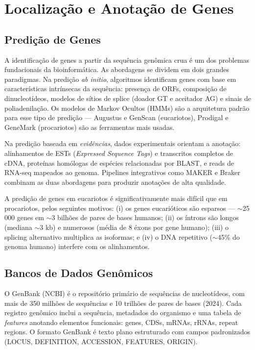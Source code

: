 \section{Localização e Anotação de Genes}

\subsection{Predição de Genes}

A identificação de genes a partir da sequência genômica crua é um dos problemas fundacionais
da bioinformática. As abordagens se dividem em dois grandes paradigmas. Na predição
\emph{ab initio}, algoritmos identificam genes com base em características intrínsecas da
sequência: presença de ORFs, composição de dinucleotídeos, modelos de sítios de splice
(doador GT e aceitador AG) e sinais de poliadenilação. Os modelos de Markov Ocultos (HMMs)
são a arquitetura padrão para esse tipo de predição --- Augustus e GenScan (eucariotos),
Prodigal e GeneMark (procariotos) são as ferramentas mais usadas.

Na predição baseada em \emph{evidências}, dados experimentais orientam a anotação:
alinhamentos de ESTs (\textit{Expressed Sequence Tags}) e transcritos completos de cDNA,
proteínas homólogas de espécies relacionadas por BLAST, e reads de RNA-seq mapeados ao
genoma. Pipelines integrativos como MAKER e Braker combinam as duas abordagens para
produzir anotações de alta qualidade.

A predição de genes em eucariotos é significativamente mais difícil que em procariotos,
pelos seguintes motivos: (i) os genes eucarióticos são esparsos --- $\sim$25\,000 genes em
$\sim$3 bilhões de pares de bases humanos; (ii) os íntrons são longos (mediana $\sim$3 kb)
e numerosos (média de 8 éxons por gene humano); (iii) o splicing alternativo multiplica as
isoformas; e (iv) o DNA repetitivo ($\sim$45\% do genoma humano) interfere com os
alinhamentos.

\subsection{Bancos de Dados Genômicos}

O GenBank (NCBI) é o repositório primário de sequências de nucleotídeos, com mais de 350
milhões de sequências e 10 trilhões de pares de bases (2024). Cada registro genômico inclui
a sequência, metadados do organismo e uma tabela de \emph{features} anotando elementos
funcionais: genes, CDSs, mRNAs, rRNAs, repeat regions. O formato GenBank é texto plano
estruturado com campos padronizados (LOCUS, DEFINITION, ACCESSION, FEATURES, ORIGIN).

